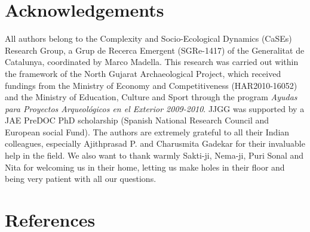 \documentclass[authoryear,preprint,review,12pt]{elsarticle}
\begin{document}
\section{Acknowledgements}
\label{sec:acknowledgements}
All authors belong to the Complexity and Socio-Ecological Dynamics (CaSEs) Research Group, a Grup de Recerca Emergent (SGRe-1417) of the Generalitat de Catalunya, coordinated by Marco Madella. This research was carried out within the framework of the North Gujarat Archaeological Project, which received fundings from the Ministry of Economy and Competitiveness (HAR2010-16052) and the Ministry of Education, Culture and Sport through the program \textit{Ayudas para Proyectos Arqueológicos en el Exterior 2009-2010}. JJGG was supported by a JAE PreDOC PhD scholarship (Spanish National Research Council and European social Fund). The authors are extremely grateful to all their Indian colleagues, especially Ajithprasad P. and Charusmita Gadekar for their invaluable help in the field. We also want to thank warmly Sakti-ji, Nema-ji, Puri Sonal and Nita for welcoming us in their home, letting us make holes in their floor and being very patient with all our questions.

\section{References}




\end{document}

